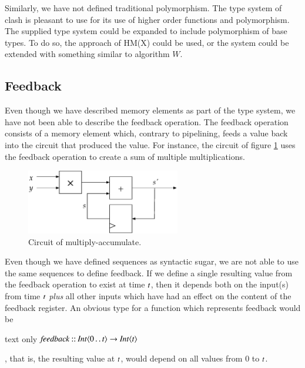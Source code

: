 Similarly, we have not defined traditional polymorphism.
The type system of \gls{clash} is pleasant to use for its use of higher order functions and polymorphism.
The supplied type system could be expanded to include polymorphism of base types.
To do so, the approach of HM(X) could be used, or the system could be extended with something similar to algorithm $W$.

\subsection{Feedback}
Even though we have described memory elements as part of the type system, we have not been able to describe the feedback operation.
The feedback operation consists of a memory element which, contrary to pipelining, feeds a value back into the circuit that produced the value.
For instance, the circuit of figure \ref{fig:mulaccstate} uses the feedback operation to create a sum of multiple multiplications.

\begin{figure}[H]
\begin{center}
\centering
\includegraphics[width=0.6\textwidth]{images/mulaccstate}
\end{center}
\caption{Circuit of multiply-accumulate.} \label{fig:mulaccstate}
\end{figure}

Even though we have defined sequences as syntactic sugar, we are not able to use the same sequences to define feedback.
If we define a single resulting value from the feedback operation to exist at time \ensuremath{\Varid{t}}, then it depends both on the input(s) from time \ensuremath{\Varid{t}} \textit{plus} all other inputs which have had an effect on the content of the feedback register.
An obvious type for a function which represents feedback would be
\begin{changemargin}{1cm}{0cm}
\begin{expansionno}{text only}
\ensuremath{\Varid{feedback}\mathbin{::}\Conid{Int}\langle\mathrm{0}\mathinner{\ldotp\ldotp}\Varid{t}\rangle\to \Conid{Int}\langle\Varid{t}\rangle}
\end{expansionno}
\end{changemargin}
, that is, the resulting value at \ensuremath{\Varid{t}}, would depend on all values from \ensuremath{\mathrm{0}} to \ensuremath{\Varid{t}}.

